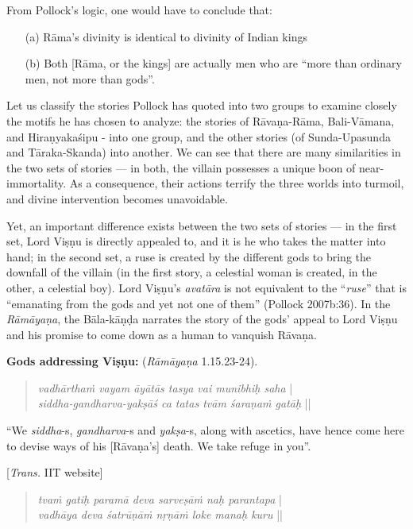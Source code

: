 From Pollock’s logic, one would have to conclude that:\\[-18pt] 
\begin{itemize}
\itemsep=-1pt
\item[(a)] Rāma’s divinity is identical to divinity of Indian kings 
\item[(b)] Both [Rāma, or the kings] are actually men who are “more than ordinary men, not more than gods”.  
\end{itemize}
Let us classify the stories Pollock has quoted into two groups to examine closely the motifs he has chosen to analyze: the stories of Rāvaṇa-Rāma, Bali-Vāmana, and Hiraṇyakaśipu - into one group, and the other stories (of Sunda-Upasunda and Tāraka-Skanda) into another. We can see that there are many similarities in the two sets of stories --- in both, the villain possesses a unique boon of near- immortality. As a consequence, their actions terrify the three worlds into turmoil, and divine intervention becomes unavoidable.

Yet, an important difference exists between the two sets of stories --- in the first set, Lord Viṣṇu is directly appealed to, and it is he who takes the matter into hand; in the second set, a ruse is created by the different gods to bring the downfall of the villain (in the first story, a celestial woman is created, in the other, a celestial boy). Lord Viṣṇu’s {\sl avatāra} is not equivalent to the “{\sl ruse}” that is “emanating from the gods and yet not one of them” (Pollock 2007b:36). In the {\sl Rāmāyaṇa}, the Bāla-kāṇḍa narrates the story of the gods’ appeal to Lord Viṣṇu and his promise to come down as a human to vanquish Rāvaṇa. 

\smallskip
\textbf{Gods addressing Viṣṇu:} ({\sl Rāmāyaṇa} 1.15.23-24).\\[-20pt]
\begin{quote}
{{\sl vadhārthaṁ vayam āyātās tasya vai munibhiḥ saha}} |\\
{\sl siddha-gandharva-yakṣāś ca tatas tvām śaraṇaṁ gatāḥ} ||
\end{quote}

\begin{myquote}
“We {\sl siddha}-s, {\sl gandharva}-s and {\sl yakṣa}-s, along with ascetics, have hence come here to devise ways of his [Rāvaṇa’s] death. We take refuge in you”.

\hfill[{\sl Trans.} IIT website]
\end{myquote}
\begin{quote}
{{\sl tvaṁ gatiḥ paramā deva sarveṣāṁ naḥ parantapa}} |\\
{\sl vadhāya deva śatrūṇāṁ nṛṇāṁ loke manaḥ kuru} ||
\end{quote}

